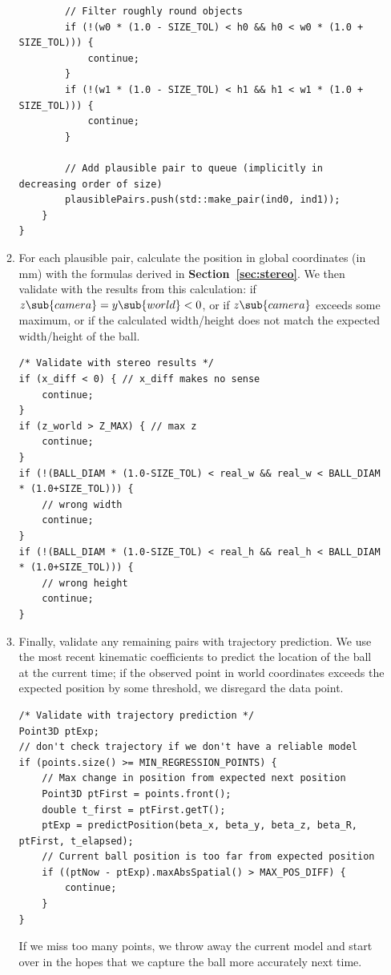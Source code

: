 \documentclass[letterpaper, 11pt]{article}
\newcommand*{\secref}[1]{\textbf{Section~\ref{#1}}}
\begin{document}
\begin{enumerate}[label=\textbf{\arabic*.}]
\begin{enumerate}[label=\textbf{Step \arabic*.}]
\begin{verbatim}
        // Filter roughly round objects
        if (!(w0 * (1.0 - SIZE_TOL) < h0 && h0 < w0 * (1.0 + SIZE_TOL))) {
            continue;
        }
        if (!(w1 * (1.0 - SIZE_TOL) < h1 && h1 < w1 * (1.0 + SIZE_TOL))) {
            continue;
        }

        // Add plausible pair to queue (implicitly in decreasing order of size)
        plausiblePairs.push(std::make_pair(ind0, ind1));
    }
}
        \end{verbatim}
    \item For each plausible pair, calculate the position in global coordinates (in mm) with the formulas derived in \secref{sec:stereo}. We then validate with the results from this calculation: if $z\sub{camera} = y\sub{world} < 0$, or if $z\sub{camera}$ exceeds some maximum, or if the calculated width/height does not match the expected width/height of the ball.
        \begin{verbatim}
/* Validate with stereo results */
if (x_diff < 0) { // x_diff makes no sense
    continue;
}
if (z_world > Z_MAX) { // max z
    continue;
}
if (!(BALL_DIAM * (1.0-SIZE_TOL) < real_w && real_w < BALL_DIAM * (1.0+SIZE_TOL))) {
    // wrong width
    continue;
}
if (!(BALL_DIAM * (1.0-SIZE_TOL) < real_h && real_h < BALL_DIAM * (1.0+SIZE_TOL))) {
    // wrong height
    continue;
}
        \end{verbatim}
    \item Finally, validate any remaining pairs with trajectory prediction. We use the most recent kinematic coefficients to predict the location of the ball at the current time; if the observed point in world coordinates exceeds the expected position by some threshold, we disregard the data point.
        \begin{verbatim}
/* Validate with trajectory prediction */
Point3D ptExp;
// don't check trajectory if we don't have a reliable model
if (points.size() >= MIN_REGRESSION_POINTS) {
    // Max change in position from expected next position
    Point3D ptFirst = points.front();
    double t_first = ptFirst.getT();
    ptExp = predictPosition(beta_x, beta_y, beta_z, beta_R, ptFirst, t_elapsed);
    // Current ball position is too far from expected position
    if ((ptNow - ptExp).maxAbsSpatial() > MAX_POS_DIFF) {
        continue;
    }
}
        \end{verbatim}
        If we miss too many points, we throw away the current model and start over in the hopes that we capture the ball more accurately next time.
\end{enumerate}


\end{enumerate}
\end{document}
